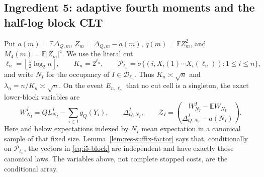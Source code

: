 \documentclass[11pt]{article}
\numberwithin{equation}{section}
\newcommand{\1}{\mathbf 1}\newcommand{\F}{\mathcal F}\newcommand{\D}{\mathcal D}
\begin{document}
\subsection{Ingredient 5: adaptive fourth moments and the half-log block CLT}
\label{sec:ingredient-five-d}
Put $a(m)=\mathbb E\Delta_{Q,m}$, $Z_m=\Delta_{Q,m}-a(m)$,
$q(m)=\mathbb EZ_m^2$, and $M_4(m)=\mathbb E|Z_m|^4$.  We use the
literal cut
\[
 \ell_n=\left\lfloor\tfrac12\log _2n\right\rfloor,
 \qquad K_n=2^{\ell_n},\qquad
 \mathcal P_{\ell_n}=\sigma\{(i,X_i(1)\cdots X_i(\ell_n)):1\le i\le n\},
\]
and write $N_I$ for the occupancy of $I\in\mathcal D_{\ell_n}$.  Thus
$K_n\asymp\sqrt n$ and $\lambda_n=n/K_n\asymp\sqrt n$.  On the event
$E_{n,\ell_n}$ that no cut cell is a singleton, the exact lower-block
variables are
\[
 W_{N_I}^{I}=QL_{N_I}^{I}-\sum_{i\in I}g_Q(Y_i),\qquad
 \Delta_{Q,N_I}^{I},\qquad
 \mathcal Z_I=\binom{W_{N_I}^{I}-\mathbb EW_{N_I}}
 {\Delta_{Q,N_I}^{I}-a(N_I)}.                         \tag{5.1}\label{eq:i5-block}
\]
Here and below expectations indexed by $N_I$ mean expectation in a canonical
sample of that fixed size.  Lemma~\ref{lem:res-suffix-factor} says that,
conditionally on $\mathcal P_{\ell_n}$, the vectors in \eqref{eq:i5-block}
are independent and have exactly those canonical laws.  The variables above,
not complete stopped costs, are the conditional array.
\end{document}
